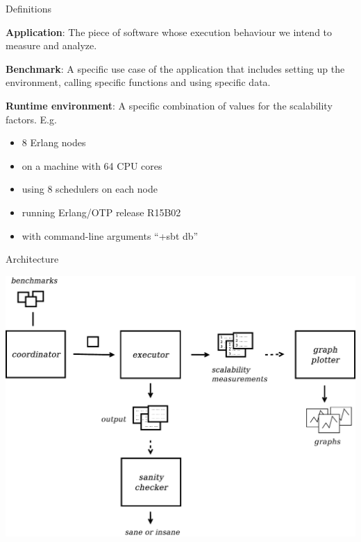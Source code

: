\documentclass{beamer}
\begin{document}
\begin{frame}[t]{Definitions}

	\vspace{5pt}
	{\bf Application}: The \textcolor{burgundy}{piece of software} whose execution behaviour we intend to measure and analyze.

    \vspace{5pt}
	{\bf Benchmark}: A specific \textcolor{burgundy}{use case} of the \textcolor{burgundy}{application} that includes setting up the environment, calling specific functions and using specific data.

    \vspace{5pt}
	{\bf Runtime environment}: A specific combination of values for the \textcolor{burgundy}{scalability factors}.
        E.g. 
        \begin{itemize}
        \item 8 \textcolor{burgundy}{Erlang nodes}
        \item on a machine with 64 \textcolor{burgundy}{CPU cores}
        \item using 8 \textcolor{burgundy}{schedulers} on each node
        \item running Erlang/OTP \textcolor{burgundy}{release} R15B02 
        \item with \textcolor{burgundy}{command-line arguments} ``+sbt db'' 
        \end{itemize}
\end{frame}

\begin{frame}[t]{Architecture}
	\begin{center}
		\includegraphics[width=0.8\linewidth]{figures/architecture.pdf}
	\end{center}
\end{frame}
\end{document}
